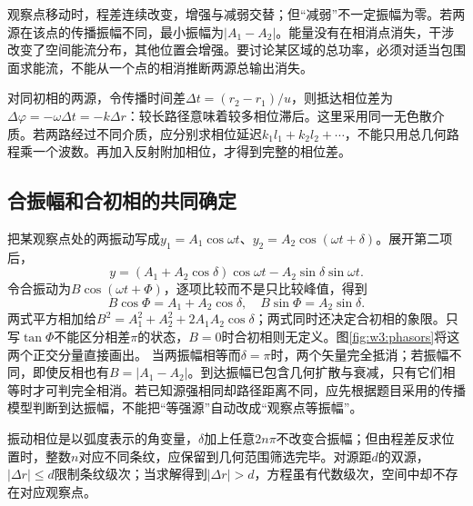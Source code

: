 观察点移动时，程差连续改变，增强与减弱交替；但“减弱”不一定振幅为零。若两源在该点的传播振幅不同，最小振幅为$|A_1-A_2|$。能量没有在相消点消失，干涉改变了空间能流分布，其他位置会增强。要讨论某区域的总功率，必须对适当包围面求能流，不能从一个点的相消推断两源总输出消失。

对同初相的两源，令传播时间差$\Delta t=(r_2-r_1)/u$，则抵达相位差为$\Delta\varphi=-\omega\Delta t=-k\Delta r$：较长路径意味着较多相位滞后。这里采用同一无色散介质。若两路经过不同介质，应分别求相位延迟$k_1l_1+k_2l_2+\cdots$，不能只用总几何路程乘一个波数。再加入反射附加相位，才得到完整的相位差。


\subsection{合振幅和合初相的共同确定}
把某观察点处的两振动写成$y_1=A_1\cos\omega t$、$y_2=A_2\cos(\omega t+\delta)$。展开第二项后，
\[
y=(A_1+A_2\cos\delta)\cos\omega t
-A_2\sin\delta\sin\omega t.
\]
令合振动为$B\cos(\omega t+\Phi)$，逐项比较而不是只比较峰值，得到
\[
B\cos\Phi=A_1+A_2\cos\delta,\quad
B\sin\Phi=A_2\sin\delta.
\]
两式平方相加给$B^2=A_1^2+A_2^2+2A_1A_2\cos\delta$；两式同时还决定合初相的象限。只写$\tan\Phi$不能区分相差$\pi$的状态，$B=0$时合初相则无定义。图\ref{fig:w3:phasors}将这两个正交分量直接画出。
当两振幅相等而$\delta=\pi$时，两个矢量完全抵消；若振幅不同，即使反相也有$B=|A_1-A_2|$。到达振幅已包含几何扩散与衰减，只有它们相等时才可判完全相消。若已知源强相同却路径距离不同，应先根据题目采用的传播模型判断到达振幅，不能把“等强源”自动改成“观察点等振幅”。

振动相位是以弧度表示的角变量，$\delta$加上任意$2n\pi$不改变合振幅；但由程差反求位置时，整数$n$对应不同条纹，应保留到几何范围筛选完毕。对源距$d$的双源，$|\Delta r|\le d$限制条纹级次；当求解得到$|\Delta r|>d$，方程虽有代数级次，空间中却不存在对应观察点。

